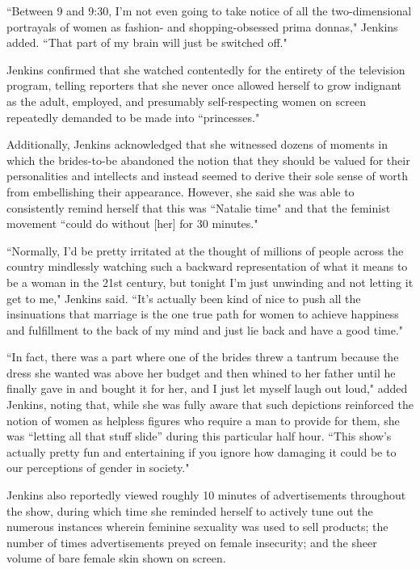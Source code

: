 \begin{linenumbers*}
\indent ``Between 9 and 9:30, I'm not even going to take notice of all the two-dimensional portrayals of women as fashion- and shopping-obsessed prima donnas," Jenkins added. ``That part of my brain will just be switched off."

\indent Jenkins confirmed that she watched contentedly for the entirety of the television program, telling reporters that she never once allowed herself to grow indignant as the adult, employed, and presumably self-respecting women on screen repeatedly demanded to be made into ``princesses."

\indent Additionally, Jenkins acknowledged that she witnessed dozens of moments in which the brides-to-be abandoned the notion that they should be valued for their personalities and intellects and instead seemed to derive their sole sense of worth from embellishing their appearance. However, she said she was able to consistently remind herself that this was ``Natalie time" and that the feminist movement ``could do without [her] for 30 minutes."

\indent ``Normally, I'd be pretty irritated at the thought of millions of people across the country mindlessly watching such a backward representation of what it means to be a woman in the 21st century, but tonight I'm just unwinding and not letting it get to me," Jenkins said. ``It's actually been kind of nice to push all the insinuations that marriage is the one true path for women to achieve happiness and fulfillment to the back of my mind and just lie back and have a good time." 

\indent ``In fact, there was a part where one of the brides threw a tantrum because the dress she wanted was above her budget and then whined to her father until he finally gave in and bought it for her, and I just let myself laugh out loud," added Jenkins, noting that, while she was fully aware that such depictions reinforced the notion of women as helpless figures who require a man to provide for them, she was “letting all that stuff slide” during this particular half hour. ``This show's actually pretty fun and entertaining if you ignore how damaging it could be to our perceptions of gender in society."

\indent Jenkins also reportedly viewed roughly 10 minutes of advertisements throughout the show, during which time she reminded herself to actively tune out the numerous instances wherein feminine sexuality was used to sell products; the number of times advertisements preyed on female insecurity; and the sheer volume of bare female skin shown on screen.


\end{linenumbers*}
